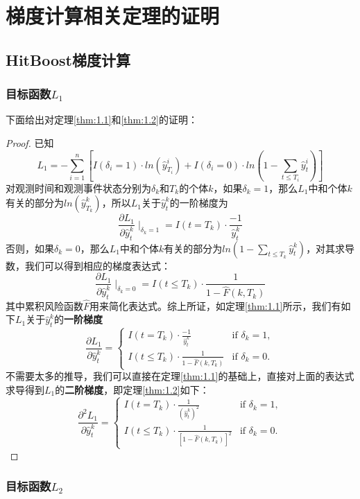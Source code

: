 
\thesisappendix

\chapter{梯度计算相关定理的证明}

\section{HitBoost梯度计算}

\subsection{目标函数$L_1$}

下面给出对定理\ref{thm:1.1}和\ref{thm:1.2}的证明：
\begin{proof}
已知$$L_1 = -\sum_{i=1}^{n} \left[ I(\delta_i=1)\cdot ln(\hat{y}_{T_i}^i) + I(\delta_i=0)\cdot ln(1-\sum_{t\le T_i}\hat{y}_t^i) \right]$$ 对观测时间和观测事件状态分别为$\delta_k$和$T_k$的个体$k$，如果$\delta_k = 1$，那么$L_1$中和个体$k$有关的部分为$ln(\hat{y}_{T_k}^k)$，所以$L_1$关于$\hat{y}_t^k$的一阶梯度为$$\frac{\partial L_1}{\partial \hat{y}_t^k} \mid_{\delta_k = 1} = I(t=T_k)\cdot \frac{-1}{\hat{y}_t^k}$$ 否则，如果$\delta_k = 0$，那么$L_1$中和个体$k$有关的部分为$ln(1-\sum_{t\le T_k}\hat{y}_t^k)$，对其求导数，我们可以得到相应的梯度表达式：$$\frac{\partial L_1}{\partial \hat{y}_t^k} \mid_{\delta_k = 0} = I(t\le T_k)\cdot \frac{1}{1-\hat{F}(k, T_k)}$$ 其中累积风险函数$\hat{F}$用来简化表达式。综上所证，如定理\ref{thm:1.1}所示，我们有如下$L_1$关于$\hat{y}_t^k$的\textbf{一阶梯度}$$
\frac{\partial L_1}{\partial \hat{y}_t^k}=
\begin{cases}
  I(t=T_k)\cdot \frac{-1}{\hat{y}_t^k} & \text{if } \delta_k = 1,\\
  I(t\le T_k)\cdot \frac{1}{1-\hat{F}(k, T_k)} & \text{if } \delta_k = 0.
\end{cases}
$$ 不需要太多的推导，我们可以直接在定理\ref{thm:1.1}的基础上，直接对上面的表达式求导得到$L_1$的\textbf{二阶梯度}，即定理\ref{thm:1.2}如下：$$
\frac{\partial^2 L_1}{\partial \hat{y}_t^k}=
\begin{cases}
  I(t=T_k)\cdot \frac{1}{{(\hat{y}_t^k)}^2} & \text{if } \delta_k = 1,\\
  I(t\le T_k)\cdot \frac{1}{{[1-\hat{F}(k, T_k)]}^2} & \text{if } \delta_k = 0.
\end{cases}
$$
\end{proof}

\subsection{目标函数$L_2$}

